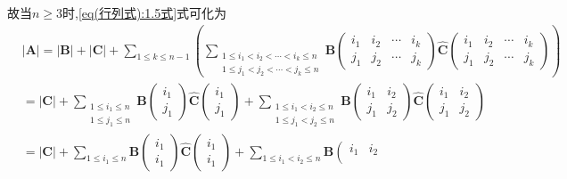 \documentclass[lang=cn,newtx,10pt,scheme=chinese]{elegantbook}
\begin{document}
\begin{solution}
    故当\(n\geqslant 3\)时,\eqref{eq(行列式):1.5式}式可化为
    \begin{align*}
       &|\boldsymbol{A}| = |\boldsymbol{B}| + |\boldsymbol{C}| + \sum_{1\leqslant k\leqslant n - 1}\left(\sum_{\substack{
    1\leqslant i_1 < i_2 < \cdots < i_k\leqslant n\\
    1\leqslant j_1 < j_2 < \cdots < j_k\leqslant n
    }}\boldsymbol{B}\left(\begin{matrix}
    i_1 & i_2 & \cdots & i_k\\
    j_1 & j_2 & \cdots & j_k
    \end{matrix}\right)\widehat{\boldsymbol{C}}\left(\begin{matrix}
    i_1 & i_2 & \cdots & i_k\\
    j_1 & j_2 & \cdots & j_k
    \end{matrix}\right)\right) 
    \\
    &= |\boldsymbol{C}| + \sum_{\substack{
    1\leqslant i_1\leqslant n\\
    1\leqslant j_1\leqslant n
  }}\boldsymbol{B}\left(\substack{
    i_1\\
    j_1
   }\right)\widehat{\boldsymbol{C}}\left(\begin{array}{c}
    i_1\\
    j_1
    \end{array}\right) + \sum_{\substack{
    1\leqslant i_1 < i_2\leqslant n\\
    1\leqslant j_1 < j_2\leqslant n
    }}\boldsymbol{B}\left(\begin{matrix}
    i_1 & i_2\\
    j_1 & j_2
    \end{matrix}\right)\widehat{\boldsymbol{C}}\left(\begin{matrix}
    i_1 & i_2\\
    j_1 & j_2
    \end{matrix}\right)
    \\
    &= |\boldsymbol{C}| + \sum_{1\leqslant i_1\leqslant n}\boldsymbol{B}\left(\begin{array}{c}
    i_1\\
    i_1
    \end{array}\right)\widehat{\boldsymbol{C}}\left(\begin{array}{c}
    i_1\\
    i_1
    \end{array}\right) + \sum_{1\leqslant i_1 < i_2\leqslant n}\boldsymbol{B}\left(\begin{matrix}
    i_1 & i_2\\

\end{matrix}
\end{align*}
\end{solution}
\end{document}
